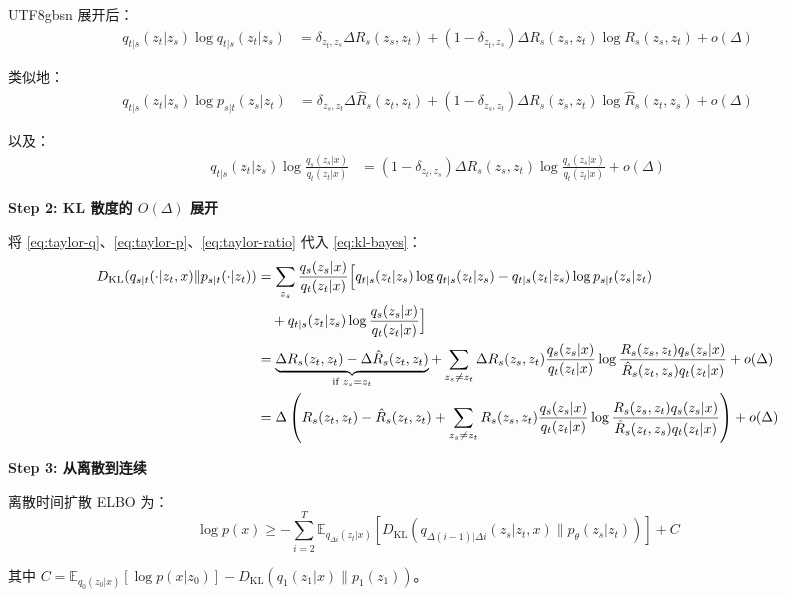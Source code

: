\documentclass[11pt,a4paper]{article}
\newcommand{\Dkl}{D_{\mathrm{KL}}}
\begin{document}
\begin{CJK}{UTF8}{gbsn}
展开后：
\begin{align}
q_{t|s}(z_t|z_s) \log q_{t|s}(z_t|z_s) &= \delta_{z_t,z_s} \Delta R_s(z_s, z_t) + (1-\delta_{z_t,z_s}) \Delta R_s(z_s, z_t) \log R_s(z_s, z_t) + o(\Delta) \label{eq:taylor-q}
\end{align}

类似地：
\begin{align}
q_{t|s}(z_t|z_s) \log p_{s|t}(z_s|z_t) &= \delta_{z_s,z_t} \Delta \hat{R}_s(z_t, z_t) + (1-\delta_{z_s,z_t}) \Delta R_s(z_s, z_t) \log \hat{R}_s(z_t, z_s) + o(\Delta) \label{eq:taylor-p}
\end{align}

以及：
\begin{align}
q_{t|s}(z_t|z_s) \log \frac{q_s(z_s|x)}{q_t(z_t|x)} &= (1-\delta_{z_t,z_s}) \Delta R_s(z_s, z_t) \log \frac{q_s(z_s|x)}{q_t(z_t|x)} + o(\Delta) \label{eq:taylor-ratio}
\end{align}

\textbf{Step 2: KL 散度的 $O(\Delta)$ 展开}

将 \eqref{eq:taylor-q}、\eqref{eq:taylor-p}、\eqref{eq:taylor-ratio} 代入 \eqref{eq:kl-bayes}：
\begin{align}
\Dkl(q_{s|t}(\cdot|z_t,x) \| p_{s|t}(\cdot|z_t)) &= \sum_{z_s} \frac{q_s(z_s|x)}{q_t(z_t|x)} \Big[ q_{t|s}(z_t|z_s) \log q_{t|s}(z_t|z_s) - q_{t|s}(z_t|z_s) \log p_{s|t}(z_s|z_t) \notag \\
&\quad + q_{t|s}(z_t|z_s) \log \frac{q_s(z_s|x)}{q_t(z_t|x)} \Big] \notag \\
&= \underbrace{\Delta R_s(z_t, z_t) - \Delta \hat{R}_s(z_t, z_t)}_{\text{if } z_s = z_t} + \sum_{z_s \neq z_t} \Delta R_s(z_s, z_t) \frac{q_s(z_s|x)}{q_t(z_t|x)} \log \frac{R_s(z_s, z_t) q_s(z_s|x)}{\hat{R}_s(z_t, z_s) q_t(z_t|x)} + o(\Delta) \notag \\
&= \Delta \left( R_s(z_t, z_t) - \hat{R}_s(z_t, z_t) + \sum_{z_s \neq z_t} R_s(z_s, z_t) \frac{q_s(z_s|x)}{q_t(z_t|x)} \log \frac{R_s(z_s, z_t) q_s(z_s|x)}{\hat{R}_s(z_t, z_s) q_t(z_t|x)} \right) + o(\Delta) \label{eq:kl-expansion}
\end{align}

\textbf{Step 3: 从离散到连续}

离散时间扩散 ELBO 为：
\[
\log p(x) \geq -\sum_{i=2}^{T} \mathbb{E}_{q_{\Delta i}(z_t|x)} \left[ \Dkl(q_{\Delta(i-1)|\Delta i}(z_s|z_t, x) \| p_\theta(z_s|z_t)) \right] + C
\]

其中 $C = \mathbb{E}_{q_0(z_0|x)}[\log p(x|z_0)] - \Dkl(q_1(z_1|x) \| p_1(z_1))$。


\end{CJK}
\end{document}
